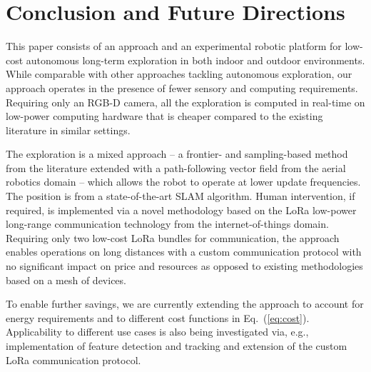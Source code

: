 \documentclass[letterpaper,10pt,conference,twoside]{IEEEtran}
\theoremstyle{definition}
\begin{document}
\section{Conclusion and Future Directions}
\label{sec:cf}
\noindent
This paper consists of an %
approach and an experimental robotic platform 
for low-cost autonomous long-term exploration in both indoor and outdoor %
environments. While comparable with other %
approaches tackling autonomous exploration, %
our approach %
operates in the presence of fewer sensory and computing requirements. Requiring only an RGB-D camera, all the exploration is computed in real-time on low-power computing hardware that is cheaper compared to the existing literature %
in similar settings.%

The exploration is %
a %
mixed approach -- a frontier- and sampling-based method from the literature 
extended with a path-following vector field %
from the aerial robotics domain 
-- which allows the robot to operate at lower update frequencies. The position is from a state-of-the-art SLAM algorithm. %
Human intervention, if required, is implemented via a novel methodology based on the LoRa low-power long-range communication technology %
from the internet-of-things domain. 
Requiring only two low-cost LoRa bundles for communication, the approach enables operations on long distances with a custom communication protocol with no significant impact on price and resources as opposed to existing methodologies based on a mesh of devices. %

To enable further savings, we are currently extending the approach to account for energy requirements and to %
different cost functions in Eq.~(\ref{eq:cost}). Applicability to different use cases is also being investigated via, e.g., implementation of feature detection and tracking and extension of the custom LoRa communication protocol. %
\end{document}
